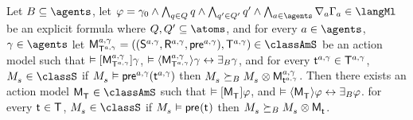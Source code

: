 \begin{lemma}\label{aaml-s-covers}
Let $\agentsB \subseteq \agents$, 
let $\phi = \gamma_0 \land \bigwedge_{\atomQ \in \atomsQ} \atomQ \land \bigwedge_{\atomQ' \in \atomsQ'} \atomQ' \land \bigwedge_{\agentA \in \agents} \coverA \Gamma_\agentA \in \langMl$ be an explicit formula where $\atomsQ, \atomsQ' \subseteq \atoms$, and 
for every $\agentA \in \agents$, $\gamma \in \agents$
let $\aPModelAndTuple[\agentA, \gamma]{\aStatesT[\agentA, \gamma]} \in \classAmS$ be an action model such that 
$\entails \actionA{\aPModel[\agentA, \gamma]{\aStatesT[\agentA, \gamma]}} \gamma$,
$\entails \actionE{\aPModel[\agentA, \gamma]{\aStatesT[\agentA, \gamma]}} \gamma \iff \someactsBs \gamma$, and
for every $\aStateT[\agentA, \gamma] \in \aStatesT[\agentA, \gamma]$, $\kPModel{\kStateS} \in \classS$ if $\kPModel{\kStateS} \entails \aPrecondition[\agentA, \gamma](\aStateT[\agentA, \gamma])$ then $\kPModel{\kStateS} \simulatesBs \kPModel{\kStateS} \exec \aPModel[\agentA, \gamma]{\aStateT[\agentA, \gamma]}$.
Then there exists an action model $\aPModel{\aStatesT} \in \classAmS$ such that 
$\entails \actionA{\aPModel{\aStatesT}} \phi$, and 
$\entails \actionE{\aPModel{\aStatesT}} \phi \iff \someactsBs \phi$.
for every $\aStateT \in \aStatesT$, $\kPModel{\kStateS} \in \classS$ if $\kPModel{\kStateS} \entails \aPrecondition(\aStateT)$ then $\kPModel{\kStateS} \simulatesBs \kPModel{\kStateS} \exec \aPModel{\aStateT}$.
\end{lemma}

